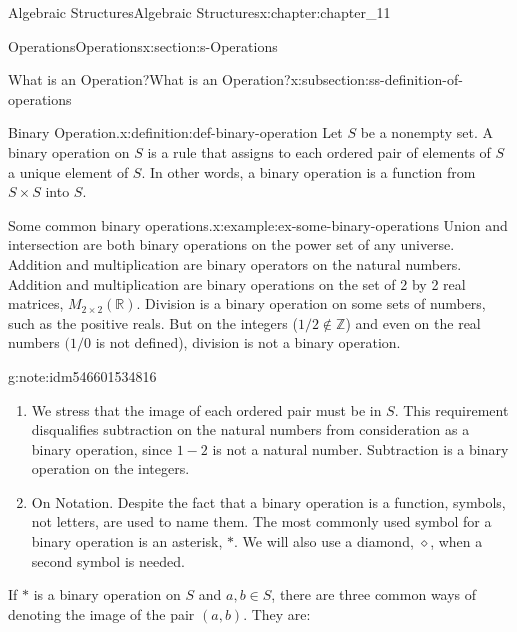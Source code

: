 \documentclass[oneside,10pt,]{book}
\numberwithin{equation}{section}
\begin{document}
\begin{chapterptx}{Algebraic Structures}{}{Algebraic Structures}{}{}{x:chapter:chapter_11}
\begin{sectionptx}{Operations}{}{Operations}{}{}{x:section:s-Operations}
\begin{introduction}{}
\end{introduction}%
%
%
\typeout{************************************************}
\typeout{************************************************}
%
\begin{subsectionptx}{What is an Operation?}{}{What is an Operation?}{}{}{x:subsection:ss-definition-of-operations}
\begin{definition}{Binary Operation.}{x:definition:def-binary-operation}%
%
\label{g:notation:idm546601807488}%
Let \(S\) be a nonempty set. A binary operation on \(S\) is a rule that assigns to each ordered pair of elements of \(S\) a unique element of \(S\). In other words, a binary operation is a function from \(S\times S\) into \(S\).%
\end{definition}
\begin{example}{Some common binary operations.}{x:example:ex-some-binary-operations}%
Union and intersection are both binary operations on the power set of any universe. Addition and multiplication are binary operators on the natural numbers. Addition and multiplication are binary operations on the set of 2 by 2 real matrices, \(M_{2\times 2}(\mathbb{R})\).  Division is a binary operation on some sets of numbers, such as the positive reals. But on the integers (\(1/2\notin \mathbb{Z}\)) and even on the real numbers \((1/0\) is not defined), division is not a binary operation.%
\end{example}
\begin{note}{}{g:note:idm546601534816}%
%
\begin{enumerate}[label=(\alph*)]
\item{}We stress that the image of each ordered pair must be in \(S\). This requirement disqualifies subtraction on the natural numbers from consideration as a binary operation, since \(1 - 2\) is not a natural number. Subtraction is a binary operation on the integers.%
\item{}On Notation. Despite the fact that a binary operation is a function, symbols, not letters, are used to name them. The most commonly used symbol for a binary operation is an asterisk, \(*\). We will also use a diamond, \(\diamond\),  when a second symbol is needed.%
\end{enumerate}
%
\end{note}
If \(*\) is a binary operation on \(S\) and \(a, b \in  S\), there are three common ways of denoting the image of the pair \((a, b)\). They are:%
\begin{equation*}

\end{equation*}
\end{subsectionptx}
\end{sectionptx}
\end{chapterptx}
\end{document}
